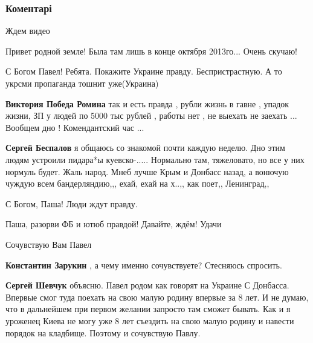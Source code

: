  
 
 
 
 
\subsubsection{Коментарі}
\label{sec:27_09_2021.fb.kuharkin_pavel.1.donbass_poezdka.cmt}

\begin{itemize} %
Ждем видео

Привет родной земле! Была там лишь в конце октября 2013го...
Очень скучаю!

С Богом Павел! Ребята. Покажите Украине правду. Беспристрастную. А то укрсми пропаганда тошнит уже(Украина)

\begin{itemize} %
\textbf{Виктория Победа Ромина} так и есть правда , рубли жизнь в гавне , упадок жизни, ЗП у людей по 5000 тыс рублей , работы нет , не выехать не заехать ... Вообщем дно ! Комендантский час ...

\textbf{Сергей Беспалов} я общаюсь со знакомой почти каждую неделю. Дно этим людям устроили пидара*ы куевско-..... Нормально там, тяжеловато, но все у них нормуль будет. Жаль народ. Мнеб лучше Крым и Донбасс назад, а вонючую чуждую всем бандерляндию,,, ехай, ехай на х..,, как поет,, Ленинград,,
\end{itemize} %

С Богом, Паша! Люди ждут правду.

Паша, разорви ФБ и ютюб правдой! Давайте, ждём! Удачи

Сочувствую Вам Павел

\begin{itemize} %
\textbf{Константин Зарукин} , а чему именно сочувствуете? Стесняюсь спросить.

\textbf{Сергей Шевчук} объясню. Павел родом как говорят на Украине С Донбасса. Впервые смог туда поехать на свою малую родину впервые за 8 лет. И не думаю, что в дальнейшем при первом желании запросто там сможет бывать. Как и я уроженец Киева не могу уже 8 лет съездить на свою малую родину и навести порядок на кладбище. Поэтому и сочувствую Павлу.


\end{itemize}
\end{itemize}
